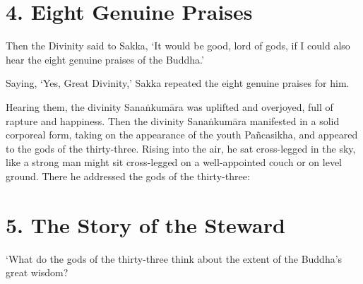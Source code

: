 \documentclass[12pt,openany]{book}%
\begin{document}
\section*{4. Eight Genuine Praises }

Then the Divinity said to Sakka, ‘It would be good, lord of gods, if I could also hear the eight genuine praises of the Buddha.’ 

Saying, ‘Yes, Great Divinity,’ Sakka repeated the eight genuine praises for him. 

Hearing them, the divinity \textsanskrit{Sanaṅkumāra} was uplifted and overjoyed, full of rapture and happiness. Then the divinity \textsanskrit{Sanaṅkumāra} manifested in a solid corporeal form, taking on the appearance of the youth \textsanskrit{Pañcasikha}, and appeared to the gods of the thirty-three. Rising into the air, he sat cross-legged in the sky, like a strong man might sit cross-legged on a well-appointed couch or on level ground. There he addressed the gods of the thirty-three: 

\section*{5. The Story of the Steward }

‘What do the gods of the thirty-three think about the extent of the Buddha’s great wisdom? 
\end{document}
